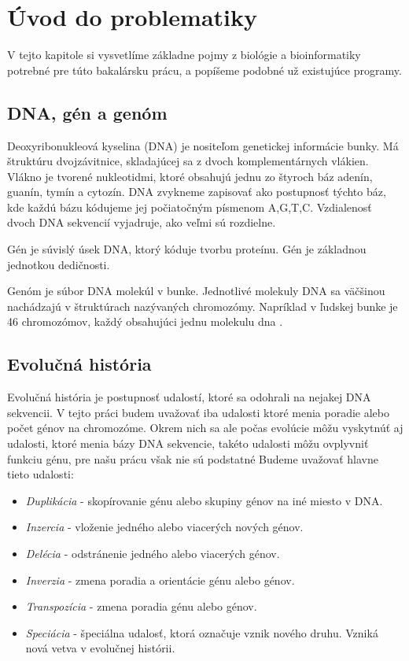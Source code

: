 \chapter{Úvod do problematiky}
V tejto kapitole si vysvetlíme základne pojmy z biológie a bioinformatiky potrebné pre túto bakalársku prácu,
a popíšeme podobné už existujúce programy.
\section{DNA, gén a genóm}
Deoxyribonukleová kyselina (DNA) je nositeľom genetickej informácie bunky.
Má štruktúru dvojzávitnice, skladajúcej sa z dvoch komplementárnych vlákien.
Vlákno je tvorené nukleotidmi, ktoré obsahujú jednu zo štyroch báz adenín, guanín, tymín a cytozín.
DNA zvykneme zapisovať ako postupnosť týchto báz, kde každú bázu kódujeme jej počiatočným písmenom A,G,T,C.
Vzdialenosť dvoch DNA sekvencií vyjadruje, ako veľmi sú rozdielne.


Gén je súvislý úsek DNA, ktorý kóduje tvorbu proteínu. Gén je základnou jednotkou dedičnosti.


Genóm je súbor DNA molekúl v bunke. Jednotlivé molekuly DNA sa väčšinou nachádzajú v štruktúrach nazývaných chromozómy.
Napríklad v ľudskej bunke je 46 chromozómov, každý obsahujúci jednu molekulu dna \cite{Zve08}.

\section{Evolučná história}\label{sec:evhist}
Evolučná história je postupnosť udalostí, ktoré sa odohrali na nejakej DNA sekvencii.
V tejto práci budem uvažovať iba udalosti ktoré menia poradie alebo počet génov na chromozóme.
Okrem nich sa ale počas evolúcie môžu vyskytnúť aj udalosti, ktoré menia bázy DNA sekvencie,
takéto udalosti môžu ovplyvniť funkciu génu, pre našu prácu však nie sú podstatné
\newline
Budeme uvažovať hlavne tieto udalosti:
\newline
\begin{itemize}
\item \emph{Duplikácia} - skopírovanie génu alebo skupiny génov na iné miesto v DNA.
\item \emph{Inzercia} - vloženie jedného alebo viacerých nových génov.
\item \emph{Delécia} - odstránenie jedného alebo viacerých génov.
\item \emph{Inverzia} - zmena poradia a orientácie génu alebo génov.
\item \emph{Transpozícia} - zmena poradia génu alebo génov.
\item \emph{Speciácia} - špeciálna udalosť, ktorá označuje vznik nového druhu. Vzniká nová vetva v evolučnej histórii.
\end{itemize}

